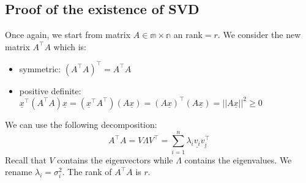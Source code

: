 \subsection{Proof of the existence of SVD}
Once again, we start from matrix $A \in \mathbb{m \times n}$ an rank$=r$. We consider the new matrix $A^\intercal A$ which is:
\begin{itemize}
    \item symmetric: $(A^\intercal A)^\intercal = A^\intercal A$
    \item positive definite: $\underline{x}^\intercal(A^\intercal A)\underline{x} = (\underline{x}^\intercal A^\intercal)(A \underline{x}) = (A\underline{x})^\intercal (A\underline{x}) = ||A\underline{x}||^2 \geq 0  $
\end{itemize} 
We can use the following decomposition:
\[
    A^\intercal A = V\Lambda V^\intercal = \sum_{i=1}^n \lambda_i \underline{v_i} \underline{v_i^\intercal}    
\]
Recall that $V$ contains the eigenvectors while $\Lambda$ contains the eigenvalues. We rename $\lambda_i = \sigma_i^2$. The rank of $A^\intercal A$ is $r$.\\

